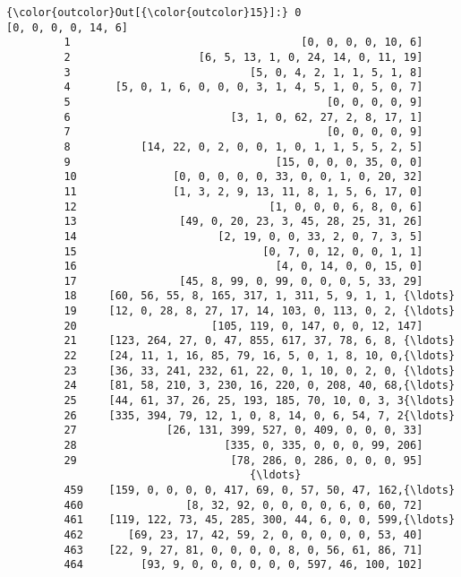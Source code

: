 \documentclass[11pt]{article}
\begin{document}
\begin{Verbatim}[commandchars=\\\{\}]
{\color{outcolor}Out[{\color{outcolor}15}]:} 0                                    [0, 0, 0, 0, 14, 6]
         1                                    [0, 0, 0, 0, 10, 6]
         2                    [6, 5, 13, 1, 0, 24, 14, 0, 11, 19]
         3                            [5, 0, 4, 2, 1, 1, 5, 1, 8]
         4       [5, 0, 1, 6, 0, 0, 0, 3, 1, 4, 5, 1, 0, 5, 0, 7]
         5                                        [0, 0, 0, 0, 9]
         6                         [3, 1, 0, 62, 27, 2, 8, 17, 1]
         7                                        [0, 0, 0, 0, 9]
         8           [14, 22, 0, 2, 0, 0, 1, 0, 1, 1, 5, 5, 2, 5]
         9                                [15, 0, 0, 0, 35, 0, 0]
         10               [0, 0, 0, 0, 0, 33, 0, 0, 1, 0, 20, 32]
         11               [1, 3, 2, 9, 13, 11, 8, 1, 5, 6, 17, 0]
         12                              [1, 0, 0, 0, 6, 8, 0, 6]
         13                [49, 0, 20, 23, 3, 45, 28, 25, 31, 26]
         14                      [2, 19, 0, 0, 33, 2, 0, 7, 3, 5]
         15                             [0, 7, 0, 12, 0, 0, 1, 1]
         16                               [4, 0, 14, 0, 0, 15, 0]
         17                [45, 8, 99, 0, 99, 0, 0, 0, 5, 33, 29]
         18     [60, 56, 55, 8, 165, 317, 1, 311, 5, 9, 1, 1, {\ldots}
         19     [12, 0, 28, 8, 27, 17, 14, 103, 0, 113, 0, 2, {\ldots}
         20                     [105, 119, 0, 147, 0, 0, 12, 147]
         21     [123, 264, 27, 0, 47, 855, 617, 37, 78, 6, 8, {\ldots}
         22     [24, 11, 1, 16, 85, 79, 16, 5, 0, 1, 8, 10, 0,{\ldots}
         23     [36, 33, 241, 232, 61, 22, 0, 1, 10, 0, 2, 0, {\ldots}
         24     [81, 58, 210, 3, 230, 16, 220, 0, 208, 40, 68,{\ldots}
         25     [44, 61, 37, 26, 25, 193, 185, 70, 10, 0, 3, 3{\ldots}
         26     [335, 394, 79, 12, 1, 0, 8, 14, 0, 6, 54, 7, 2{\ldots}
         27              [26, 131, 399, 527, 0, 409, 0, 0, 0, 33]
         28                       [335, 0, 335, 0, 0, 0, 99, 206]
         29                        [78, 286, 0, 286, 0, 0, 0, 95]
                                      {\ldots}                        
         459    [159, 0, 0, 0, 0, 417, 69, 0, 57, 50, 47, 162,{\ldots}
         460                [8, 32, 92, 0, 0, 0, 0, 6, 0, 60, 72]
         461    [119, 122, 73, 45, 285, 300, 44, 6, 0, 0, 599,{\ldots}
         462       [69, 23, 17, 42, 59, 2, 0, 0, 0, 0, 0, 53, 40]
         463    [22, 9, 27, 81, 0, 0, 0, 0, 8, 0, 56, 61, 86, 71]
         464         [93, 9, 0, 0, 0, 0, 0, 0, 597, 46, 100, 102]

\end{Verbatim}
\end{document}
